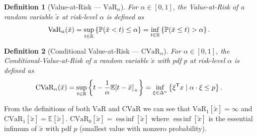 \documentclass[10pt]{article}
\newtheorem{definition}{Definition}
\newcommand{\cvar}{\text{CVaR}}
\newcommand{\cvaralpha}{\text{CVaR}_\alpha}
\newcommand{\var}{\text{VaR}}
\newcommand{\varalpha}{\text{VaR}_\alpha}
\theoremstyle{plain}
\theoremstyle{remark}
\DeclareMathOperator*{\essinf}{ess\,inf}
\begin{document}
\begin{definition}[Value-at-Risk --- $\varalpha$]\label{def:var}
        For $\alpha \in [0, 1]$, the Value-at-Risk of a random variable 
        $\tilde{x}$ at risk-level $\alpha$ is defined as
        \[
                \varalpha(\tilde{x}) = \sup_{t \in \Real} \left\{ \mathbb{P}(\tilde{x} < t) \leq \alpha \right\} = \inf_{t \in \Real} \left\{ \mathbb{P}(\tilde{x} \leq t) > \alpha \right\}.
        \]
\end{definition}

\begin{definition}[Conditional Value-at-Risk --- $\cvaralpha$]\label{def:cvar}
        For $\alpha \in [0, 1]$, the Conditional-Value-at-Risk of a random variable 
        $\tilde{x}$ with pdf $p$ at risk-level $\alpha$ is defined as
        \[
                \cvaralpha(\tilde{x}) = \sup_{t \in \Real} \left\{ t - \frac{1}{\alpha} \mathbb{E}{[t - \tilde{x}]}_+ \right\} =
                \inf_{\xi \in \Delta^n} \left\{ \xi\tr x \mid \alpha \cdot \xi \leq p \right\}.
        \]
\end{definition}

From the definitions of both $\var$ and $\cvar$ we can see that $\var_1[\tilde{x}] = \infty$ and $\cvar_1[\tilde{x}] = \mathbb{E}[\tilde{x}]$.
$\cvar_0[\tilde{x}] = \essinf[\tilde{x}]$ where $\essinf[\tilde{x}]$ is the essential infimum of $\tilde{x}$ with pdf
$p$ (smallest value with nonzero probability).
\end{document}
